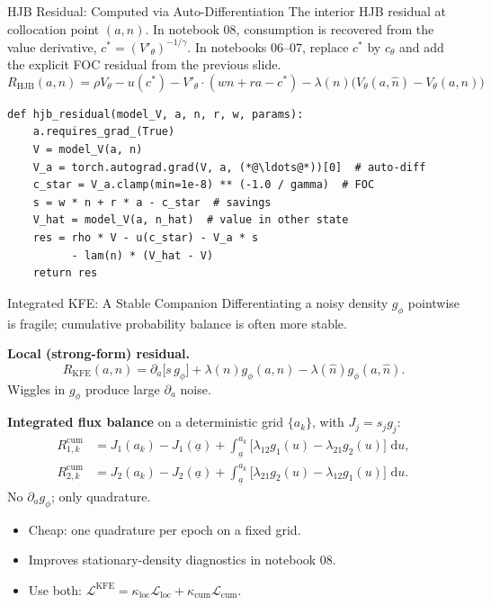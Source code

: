 \documentclass[aspectratio=169,11pt]{beamer}
\newcommand{\ud}{\,\mathrm{d}}
\newcommand{\ubar}[1]{\underline{#1}}
\begin{document}
\begin{frame}[fragile]{HJB Residual: Computed via Auto-Differentiation}
\small
The interior HJB residual at collocation point $(a, n)$.  In notebook 08, consumption is recovered from the value derivative, $c^* = (V'_\theta)^{-1/\gamma}$.  In notebooks 06--07, replace $c^*$ by $c_\theta$ and add the explicit FOC residual from the previous slide.
\vspace{-0.3em}
\[
R_{\text{HJB}}(a,n) = \rho V_\theta - u(c^*) - V'_\theta \cdot (wn + ra - c^*) - \lambda(n)\big(V_\theta(a,\hat{n}) - V_\theta(a,n)\big)
\]
\vspace{-0.5em}
\begin{lstlisting}
def hjb_residual(model_V, a, n, r, w, params):
    a.requires_grad_(True)
    V = model_V(a, n)
    V_a = torch.autograd.grad(V, a, (*@\ldots@*))[0]  # auto-diff
    c_star = V_a.clamp(min=1e-8) ** (-1.0 / gamma)  # FOC
    s = w * n + r * a - c_star  # savings
    V_hat = model_V(a, n_hat)  # value in other state
    res = rho * V - u(c_star) - V_a * s
          - lam(n) * (V_hat - V)
    return res
\end{lstlisting}
\end{frame}

\begin{frame}{Integrated KFE: A Stable Companion}
\footnotesize
Differentiating a noisy density $g_\phi$ pointwise is fragile; cumulative probability balance is often more stable.

\vspace{0.2em}
\textbf{Local (strong-form) residual.}
\vspace{-0.3em}
\[
R_{\text{KFE}}(a,n) = \partial_a\!\bigl[s\,g_\phi\bigr] + \lambda(n)g_\phi(a,n) - \lambda(\hat n)g_\phi(a,\hat n).
\]
Wiggles in $g_\phi$ produce large $\partial_a$ noise.

\vspace{0.2em}
\textbf{Integrated flux balance} on a deterministic grid $\{a_k\}$, with $J_j=s_jg_j$:
\vspace{-0.3em}
\[
\begin{aligned}
R_{1,k}^{\text{cum}}
&= J_1(a_k)-J_1(\ubar a)
   + \int_{\ubar a}^{a_k}\!\bigl[\lambda_{12}g_1(u)-\lambda_{21}g_2(u)\bigr]\,\ud u,\\
R_{2,k}^{\text{cum}}
&= J_2(a_k)-J_2(\ubar a)
   + \int_{\ubar a}^{a_k}\!\bigl[\lambda_{21}g_2(u)-\lambda_{12}g_1(u)\bigr]\,\ud u.
\end{aligned}
\]
No $\partial_a g_\phi$; only quadrature.

\vspace{0.1em}
\begin{itemize}\itemsep0pt
    \item Cheap: one quadrature per epoch on a fixed grid.
    \item Improves stationary-density diagnostics in notebook 08.
    \item Use both: $\mathcal L^{\text{KFE}}=\kappa_{\text{loc}}\mathcal L_{\text{loc}}+\kappa_{\text{cum}}\mathcal L_{\text{cum}}$.
\end{itemize}
\end{frame}
\end{document}
